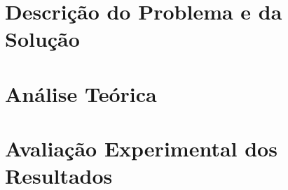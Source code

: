 \documentclass[12pt,a4paper]{article}
\begin{document}
  \section{Descrição do Problema e da Solução}

  \section{Análise Teórica}

  \section{Avaliação Experimental dos Resultados}

  \printbibliography[title={Referência}]
\end{document}

